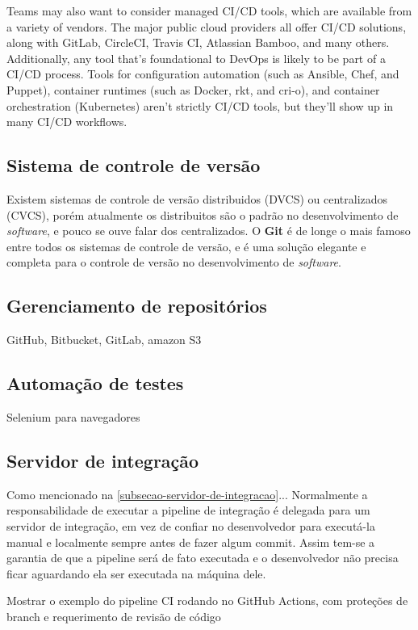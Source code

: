 Teams may also want to consider managed CI/CD tools, which are available from a variety of vendors. The major public cloud providers all offer CI/CD solutions, along with GitLab, CircleCI, Travis CI, Atlassian Bamboo, and many others.
Additionally, any tool that’s foundational to DevOps is likely to be part of a CI/CD process. Tools for configuration automation (such as Ansible, Chef, and Puppet), container runtimes (such as Docker, rkt, and cri-o), and container orchestration (Kubernetes) aren’t strictly CI/CD tools, but they’ll show up in many CI/CD workflows. \cite{redhat-ci-cd}

\subsection{Sistema de controle de versão}
Existem sistemas de controle de versão distribuidos (DVCS) ou centralizados (CVCS), porém atualmente os distribuitos são o padrão no desenvolvimento de \emph{software}, e pouco se ouve falar dos centralizados. O \textbf{Git} é de longe o mais famoso entre todos os sistemas de controle de versão, e é uma solução elegante e completa para o controle de versão no desenvolvimento de \emph{software}.

\subsection{Gerenciamento de repositórios}
GitHub, Bitbucket, GitLab, amazon S3

\subsection{Automação de testes}
Selenium para navegadores

\subsection{Servidor de integração}
Como mencionado na \autoref{subsecao-servidor-de-integracao}... Normalmente a responsabilidade de executar a pipeline de integração é delegada para um servidor de integração, em vez de confiar no desenvolvedor para executá-la manual e localmente sempre antes de fazer algum commit. Assim tem-se a garantia de que a pipeline será de fato executada e o desenvolvedor não precisa ficar aguardando ela ser executada na máquina dele.

Mostrar o exemplo do pipeline CI rodando no GitHub Actions, com proteções de branch e requerimento de revisão de código

